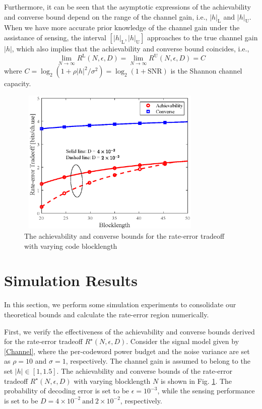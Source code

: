 \documentclass[conference,a4paper]{IEEEtran}
\begin{document}
Furthermore, it can be seen that the asymptotic expressions of the achievability and converse bound depend on the range of the channel gain, i.e., $|h|_\mathrm{L}$ and $|h|_\mathrm{U}$. When we have more accurate prior knowledge of the channel gain under the assistance of sensing, the interval $[|h|_\mathrm{L},|h|_\mathrm{U}]$ approaches to the true channel gain $|h|$, which also implies that the achievability and converse bound coincides, i.e.,
\begin{equation}
 \lim_{N\to \infty}R^\mathrm{L}(N,\epsilon,D) =  \lim_{N\to \infty}R^\mathrm{U}(N,\epsilon,D) = C
\end{equation}
where $C = \log_2(1+\rho|h|^2/\sigma^2) = \log_2(1+\mathrm{SNR})$ is the Shannon channel capacity.

\begin{figure}[t]
    \centering
    \includegraphics[width = 9cm,height = 7cm]{Fig_rate_error.eps}
    \caption{ The achievability and converse bounds for the rate-error tradeoff with varying code blocklength}
    \label{Fig_rate_error}
\end{figure}


\section{Simulation Results}
In this section, we perform some simulation experiments to consolidate our theoretical bounds and calculate the rate-error region numerically. 

First, we verify the effectiveness of the achievability and converse bounds derived for the rate-error tradeoff $R^\star(N,\epsilon,D)$. Consider the signal model given by \eqref{Channel}, where the per-codeword power budget and the noise variance are set as $\rho = 10$ and $\sigma = 1$, respectively. The channel gain is assumed to belong to the set $|h|\in[1,1.5]$. The achievability and converse bounds of the rate-error tradeoff $R^\star(N,\epsilon,D)$ with varying blocklength $N$ is shown in Fig. \ref{Fig_rate_error}. The probability of decoding error is set to be $\epsilon = 10^{-3}$, while the sensing performance is set to be $D = 4\times10^{-2}\ \mathrm{and}\ 2\times10^{-2}$, respectively. 
\end{document}
